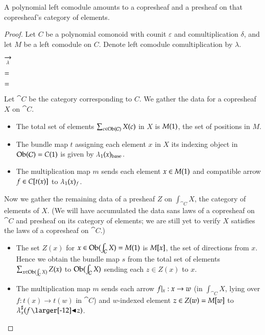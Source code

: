 \documentclass{amsart}
\begin{document}
\begin{prop}
  A polynomial left comodule amounts to a copresheaf and a presheaf on that
  copresheaf's category of elements.
\end{prop}
\begin{proof}
  Let $C$ be a polynomial comonoid with counit $\varepsilon$ and
  comultiplication $\delta$, and let $M$ be a left comodule on
  $C$. Denote left comodule comultiplication by $\lambda$.

  \begin{center}
    
    \hspace{-.75em}
    $\underset{\lambda}{\to}$
    \hspace{.5em}
    
  \end{center}

  \begin{center}
    
    \quad
    $=$
    
  \end{center}
  
  \begin{center}
    
    \quad
    $=$
    \quad
    
  \end{center}

  Let $\cat{C}$ be the category corresponding to $C$. We gather the
  data for a copresheaf $X$ on $\cat{C}$.
  \begin{itemize}
  \item The total set of elements $\sum_{c \in \operatorname{Ob}(\mathcal{C})}X(c)$ in
    $X$ is $M(1)$, the set of positions in $M$.
  \item The bundle map $t$ assigning each element $x$ in $X$ its indexing
    object in $\operatorname{Ob}(\mathcal{C}) = C(1)$ is given by ${\lambda}_1(x)_{\mathrm{base}}$.
  \item The multiplication map $m$ sends each element $x \in M(1)$
    and compatible arrow $f \in C[t(x)]$ to
    ${\lambda}_1(x)_f$.
  \end{itemize}

  Now we gather the remaining data of a presheaf $Z$ on
  $\int_{\cat{C}}X$, the category of elements of $X$. (We will have
  accumulated the data sans laws of a copresheaf on $\cat{C}$ and
  presheaf on its category of elements; we are still yet to
  verify $X$ satisfies the laws of a copresheaf on $\cat{C}$.)
  \begin{itemize}
  \item The set $Z(x)$ for $x \in \operatorname{Ob}(\int_{\mathcal{C}}X) = M(1)$ is
    $M[x]$, the set of directions from $x$. Hence we obtain the
    bundle map $s$ from the total set of elements
    $\sum_{x \in \operatorname{Ob}(\int_{\mathcal{C}}X)}Z(x)$ to $\operatorname{Ob}(\int_{\mathcal{C}}X)$
    sending each $z \in Z(x)$ to $x$.
  \item The multiplication map $m$ sends each arrow $f|_{x}: x \to w$
    (in $\int_{\cat{C}}X$, lying over $f: t(x) \to t(w)$ in $\cat{C}$)
    and $w$-indexed element $z \in Z(w) = M[w]$ to
    $\dirmapof{\lambda}{x}{f \subd z}$.


\end{itemize}
\end{proof}
\end{document}

